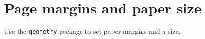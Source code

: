\documentclass{article}
\begin{document}
\section*{Page margins and paper size}

\noindent Use the \texttt{geometry} package to set paper margins and a size.
\end{document}
